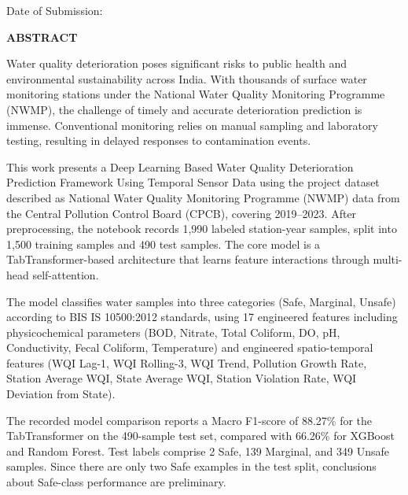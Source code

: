 \documentclass[12pt,a4paper]{report}
\numberwithin{table}{chapter}
\numberwithin{figure}{chapter}
\begin{document}
\vspace{0.8cm}
\noindent Date of Submission: \underline{\hspace{4cm}}

\newpage
\thispagestyle{plain}
\begin{center}
{\fontsize{14}{18}\selectfont\bfseries ABSTRACT\\[0.4cm]}
\end{center}

\noindent Water quality deterioration poses significant risks to public health and environmental sustainability across India. With thousands of surface water monitoring stations under the National Water Quality Monitoring Programme (NWMP), the challenge of timely and accurate deterioration prediction is immense. Conventional monitoring relies on manual sampling and laboratory testing, resulting in delayed responses to contamination events.

This work presents a Deep Learning Based Water Quality Deterioration Prediction Framework Using Temporal Sensor Data using the project dataset described as National Water Quality Monitoring Programme (NWMP) data from the Central Pollution Control Board (CPCB), covering 2019--2023. After preprocessing, the notebook records 1,990 labeled station-year samples, split into 1,500 training samples and 490 test samples. The core model is a TabTransformer-based architecture that learns feature interactions through multi-head self-attention.

The model classifies water samples into three categories (Safe, Marginal, Unsafe) according to BIS IS 10500:2012 standards, using 17 engineered features including physicochemical parameters (BOD, Nitrate, Total Coliform, DO, pH, Conductivity, Fecal Coliform, Temperature) and engineered spatio-temporal features (WQI Lag-1, WQI Rolling-3, WQI Trend, Pollution Growth Rate, Station Average WQI, State Average WQI, Station Violation Rate, WQI Deviation from State).

The recorded model comparison reports a Macro F1-score of 88.27\% for the TabTransformer on the 490-sample test set, compared with 66.26\% for XGBoost and Random Forest. Test labels comprise 2 Safe, 139 Marginal, and 349 Unsafe samples. Since there are only two Safe examples in the test split, conclusions about Safe-class performance are preliminary.
\end{document}
